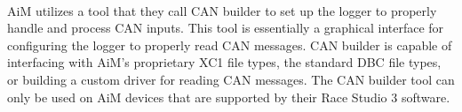 \paragraph{}
AiM utilizes a tool that they call CAN builder to set up the logger to properly handle and process CAN inputs.
This tool is essentially a graphical interface for configuring the logger to properly read CAN messages.
CAN builder is capable of interfacing with AiM's proprietary XC1 file types, the standard DBC file types, or building a custom driver for reading CAN messages.
The CAN builder tool can only be used on AiM devices that are supported by their Race Studio 3 software.
